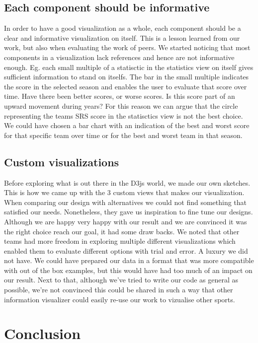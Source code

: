\documentclass{sigchi}
\begin{document}
\subsection{Each component should be informative}
In order to have a good visualization as a whole, each component should be a clear and 
informative visualization on itself. This is a lesson learned from our work, but also when
evaluating the work of peers. We started noticing that most components in a visualization 
lack references and hence are not informative enough. Eg. each small multiple of a statisctic
in the statistics view on itself gives sufficient information to stand on itselfs. The bar in
the small multiple indicates the score in the selected season and enables the user to evaluate
that score over time. Have there been better scores, or worse scores. Is this score part of 
an upward movement during years? 
For this reason we can argue that the circle representing the teams SRS score in the statisctics
view is not the best choice. We could have chosen a bar chart with an indication of the best and
worst score for that specific team over time or for the best and worst team in that season.

\subsection{Custom visualizations}
Before exploring what is out there in the D3js world, we made our own sketches. This is how
we came up with the 3 custom views that makes our visualization. When comparing our design 
with alternatives we could not find something that satisfied our needs. Nonetheless, they gave
us inspiration to fine tune our designs. Although we are happy very happy with our result and
we are convinced it was the right choice reach our goal, it had some draw backs.
We noted that other teams had more freedom in exploring multiple different visualizations which
enabled them to evaluate different options with trial and error. A luxury we did not have. We 
could have prepared our data in a format that was more compatible with out of the box examples,
but this would have had too much of an impact on our result.
Next to that, although we've tried to write our code as general as possible, we're not convinced
this could be shared in such a way that other information visualizer could easily re-use our work
to vizualise other sports.

\section{Conclusion}\label{sec:conclusion}
\end{document}
